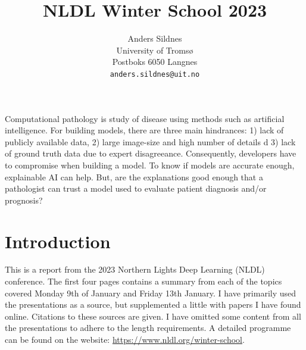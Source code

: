 \documentclass[10pt,twocolumn,letterpaper]{article}
\begin{document}
\title{NLDL Winter School 2023}

\author{Anders Sildnes\\
University of Tromsø\\
Postboks 6050 Langnes\\
{\tt\small anders.sildnes@uit.no}
}
\maketitle
Computational pathology is study of disease using methods such as artificial intelligence. For building models, there are three main hindrances: 1) lack of publicly available data, 2) large image-size and high number of details d 3) lack of ground truth data due to expert disagreeance. Consequently, developers have to compromise when building a model. To know if models are accurate enough, explainable AI can help. But, are the explanations good enough that a pathologist can trust a model used to evaluate patient diagnosis and/or prognosis? 

\section{Introduction} \label{sec:intro}
This is a report from the 2023 Northern Lights Deep Learning (NLDL) conference. The first four pages contains a summary from each of the topics covered Monday 9th of January and Friday 13th January. I have primarily used the presentations as a source, but supplemented a little with papers I have found online. Citations to these sources are given. 
I have omitted some content from all the presentations to adhere to the length requirements. A detailed programme can be found on the website: \href{https://www.nldl.org/winter-school}{https://www.nldl.org/winter-school}. 
\end{document}
